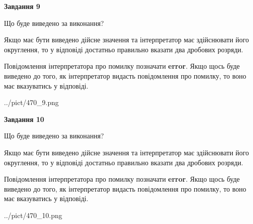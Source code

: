 \documentclass[12pt, ukrainian]{article}
\begin{document}
{\begin {Large}
{\begin {center}\textbf{Завдання 9}\end {center}}\par
Що буде виведено за виконання? \par

Якщо має бути виведено дійсне значення та інтерпретатор має здійснювати його округлення, 
то у відповіді достатньо правильно вказати два дробових розряди.

Повідомлення інтерпретатора про помилку позначати \textbf{error}.
Якщо щось буде виведено до того, як інтерпретатор видасть повідомлення про помилку, 
то воно має вказуватись у відповіді. \par

\begin{center}
	{../pict/470_9.png}
\end{center}
\newpage

{\begin {center}\textbf{Завдання 10}\end {center}}\par
Що буде виведено за виконання? \par

Якщо має бути виведено дійсне значення та інтерпретатор має здійснювати його округлення, 
то у відповіді достатньо правильно вказати два дробових розряди.

Повідомлення інтерпретатора про помилку позначати \textbf{error}.
Якщо щось буде виведено до того, як інтерпретатор видасть повідомлення про помилку, 
то воно має вказуватись у відповіді. \par

\begin{center}
	{../pict/470_10.png}
\end{center}
\newpage

\end {Large}}
\end{document}
